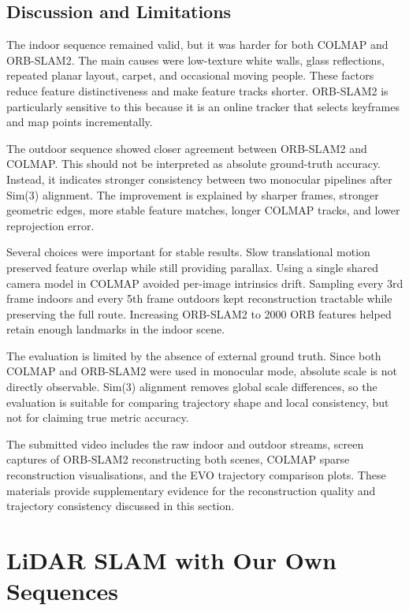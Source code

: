\documentclass[conference]{IEEEtran}
\begin{document}
\subsection{Discussion and Limitations}

The indoor sequence remained valid, but it was harder for both COLMAP and ORB-SLAM2. The main causes were low-texture white walls, glass reflections, repeated planar layout, carpet, and occasional moving people. These factors reduce feature distinctiveness and make feature tracks shorter. ORB-SLAM2 is particularly sensitive to this because it is an online tracker that selects keyframes and map points incrementally.

The outdoor sequence showed closer agreement between ORB-SLAM2 and COLMAP. This should not be interpreted as absolute ground-truth accuracy. Instead, it indicates stronger consistency between two monocular pipelines after Sim(3) alignment. The improvement is explained by sharper frames, stronger geometric edges, more stable feature matches, longer COLMAP tracks, and lower reprojection error.

Several choices were important for stable results. Slow translational motion preserved feature overlap while still providing parallax. Using a single shared camera model in COLMAP avoided per-image intrinsics drift. Sampling every 3rd frame indoors and every 5th frame outdoors kept reconstruction tractable while preserving the full route. Increasing ORB-SLAM2 to 2000 ORB features helped retain enough landmarks in the indoor scene.

The evaluation is limited by the absence of external ground truth. Since both COLMAP and ORB-SLAM2 were used in monocular mode, absolute scale is not directly observable. Sim(3) alignment removes global scale differences, so the evaluation is suitable for comparing trajectory shape and local consistency, but not for claiming true metric accuracy.

The submitted video includes the raw indoor and outdoor streams, screen captures of ORB-SLAM2 reconstructing both scenes, COLMAP sparse reconstruction visualisations, and the EVO trajectory comparison plots. These materials provide supplementary evidence for the reconstruction quality and trajectory consistency discussed in this section.

\FloatBarrier

\section{LiDAR SLAM with Our Own Sequences}
\label{sec:q3_lidar_slam}
\end{document}
